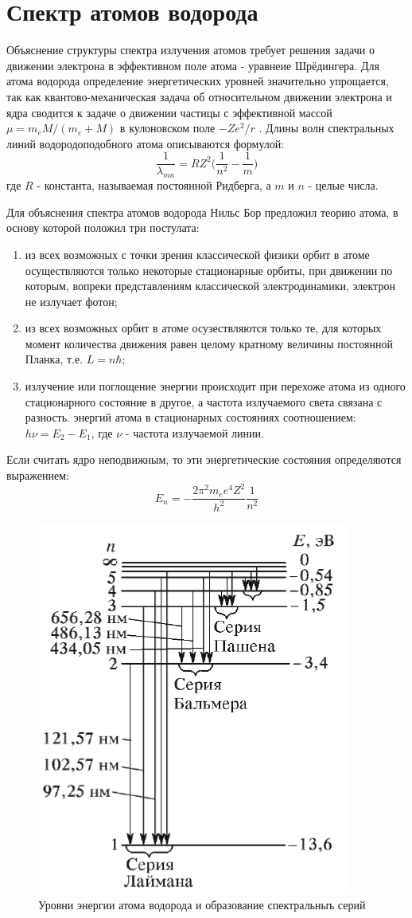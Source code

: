 \documentclass[a4paper,12pt]{article}
\begin{document}
\section{Спектр атомов водорода}
Объяснение структуры спектра излучения атомов требует решения задачи о движении электрона в эффективном поле атома - уравнеие Шрёдингера. Для атома водорода определение энергетических уровней значительно упрощается, так как квантово-механическая задача об относительном движении электрона и ядра сводится к задаче о движении частицы с эффективной массой $\mu = m_eM/(m_e+M)$ в кулоновском поле $-Ze^2/r$ . Длины волн спектральных линий водородоподобного атома описываются формулой:
\begin{equation}
    \frac{1}{\lambda_{mn}} = RZ^2\Big(\frac{1}{n^2} -\frac{1}{m}\Big)
\end{equation}
где $R$ - константа, называемая постоянной Ридберга, а $m$ и $n$ - целые числа.

Для объяснения спектра атомов водорода Нильс Бор предложил теорию атома, в основу которой положил три постулата:
\begin{enumerate}
    \item из всех возможных с точки зрения классической физики орбит в атоме осуществляются только некоторые стационарные орбиты, при движении по которым, вопреки представлениям классической электродинамики, электрон не излучает фотон;
    \item из всех возможных орбит в атоме осузествляются только те, для которых момент количества движения равен целому кратному величины постоянной Планка, т.е. $L=n\hbar$;
    \item излучение или поглощение энергии происходит при перехоже атома из одного стационарного состояние в другое, а частота излучаемого света связана с разность. энергий атома в стационарных состояниях соотношением: $h\nu=E_2-E_1$, где $\nu$ - частота излучаемой линии.
\end{enumerate}

Если считать ядро неподвижным, то эти энергетические состояния определяются выражением:
\begin{equation}
    E_n=-\frac{2\pi^2m_ee^4Z^2}{h^2}\frac{1}{n^2}
\end{equation}

\begin{figure}[h]
\centering
\includegraphics[width=0.3\linewidth]{img1.png}
\caption{Уровни энергии атома водорода и образование спектральныъ серий}
\label{img1}
\end{figure}
\end{document}
